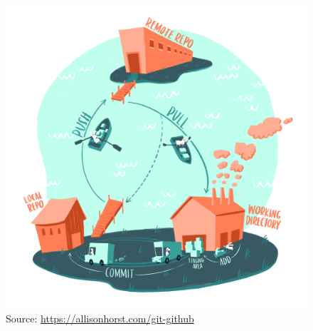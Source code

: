 \documentclass[aspectratio=1609]{beamer}
\begin{document}
    \begin{frame}
        \begin{figure}
            \includegraphics[width=\textwidth, height=\textheight, keepaspectratio]{imgs/workflow.png}
            \caption{Source: \url{https://allisonhorst.com/git-github}}
        \end{figure}
    \end{frame}
    
\end{document}

